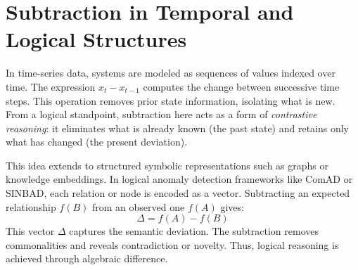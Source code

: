 \section{Subtraction in Temporal and Logical Structures}
In time-series data, systems are modeled as sequences of values indexed over time. The expression $x_t - x_{t-1}$ computes the change between successive time steps. This operation removes prior state information, isolating what is new. From a logical standpoint, subtraction here acts as a form of \emph{contrastive reasoning}: it eliminates what is already known (the past state) and retains only what has changed (the present deviation).

This idea extends to structured symbolic representations such as graphs or knowledge embeddings. In logical anomaly detection frameworks like ComAD or SINBAD, each relation or node is encoded as a vector. Subtracting an expected relationship $f(B)$ from an observed one $f(A)$ gives:
\[
\Delta = f(A) - f(B)
\]
This vector $\Delta$ captures the semantic deviation. The subtraction removes commonalities and reveals contradiction or novelty. Thus, logical reasoning is achieved through algebraic difference.